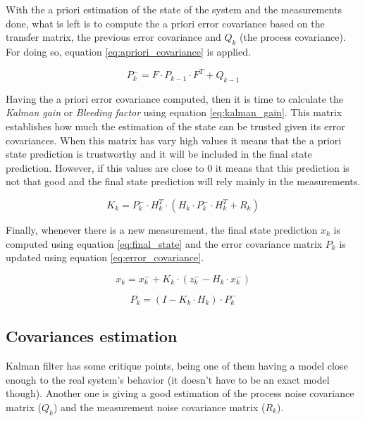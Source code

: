 With the a priori estimation of the state of the system and the measurements done, what is left is to compute the a priori error covariance \cite{OReilly} based on the transfer matrix, the previous error covariance and $Q_{k}$ (the process covariance). For doing so, equation \ref{eq:apriori_covariance} is applied.

\begin{equation}
P_{k}^{-}=F·P_{k-1}·F^{T}+Q_{k-1}
\label{eq:apriori_covariance}
\end{equation}

Having the a priori error covariance computed, then it is time to calculate the \emph{Kalman gain} or \emph{Bleeding factor} using equation \ref{eq:kalman_gain}. This matrix establishes how much the estimation of the state can be trusted given its error covariances. When this matrix has vary high values it means that the a priori state prediction is trustworthy and it will be included in the final state prediction. However, if this values are close to 0 it means that this prediction is not that good and the final state prediction will rely mainly in the measurements.

\begin{equation}
K_{k}=P_{k}^{-}·H_{k}^{T}·(H_{k}·P_{k}^{-}·H_{k}^{T}+R_{k})
\label{eq:kalman_gain}
\end{equation}

Finally, whenever there is a new measurement, the final state prediction $x_{k}$ is computed using equation \ref{eq:final_state} and the error covariance matrix $P_{k}$ is updated using equation \ref{eq:error_covariance}.

\begin{equation}
x_{k}=x_{k}^{-}+K_{k}·(z_{k}^{-}-H_{k}·x_{k}^{-})
\label{eq:final_state}
\end{equation}

\begin{equation}
P_{k}=(I-K_{k}·H_{k})·P_{k}^{-}
\label{eq:error_covariance}
\end{equation}

\subsection{Covariances estimation}
Kalman filter has some critique points, being one of them having a model close enough to the real system's behavior (it doesn't have to be an exact model though). Another one is giving a good estimation of the process noise covariance matrix ($Q_{k}$) and the measurement noise covariance matrix ($R_{k}$).\\

